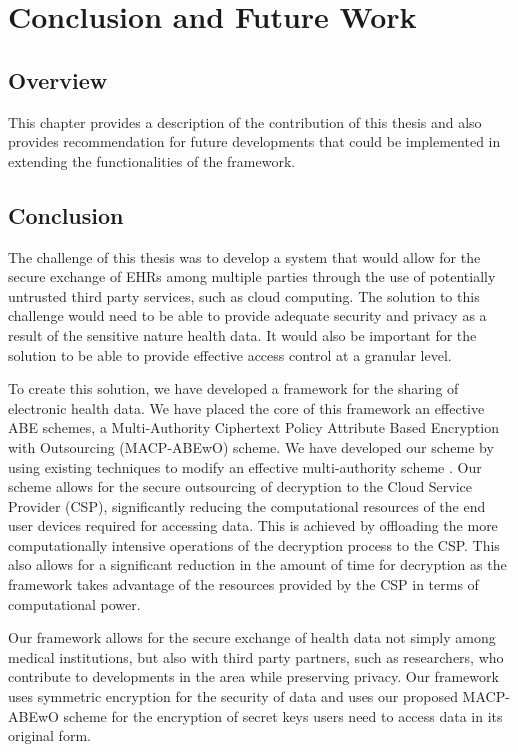 \chapter{Conclusion and Future Work}
\label{chap:conclusions}

\section{Overview}

This chapter provides a description of the contribution of this thesis and also provides recommendation for future developments that could be implemented in extending the functionalities of the framework.

\section{Conclusion}

The challenge of this thesis was to develop a system that would allow for the secure exchange of EHRs among  multiple parties through the use of potentially untrusted third party services, such as cloud computing. The solution to this challenge would need to be able to provide adequate security and privacy as a result of the sensitive nature health data. It would also be important for the solution to be able to provide effective access control at a granular level. 

To create this solution, we have developed a framework for the sharing of electronic health data. We have placed the core of this framework an effective ABE schemes, a Multi-Authority Ciphertext Policy Attribute Based Encryption with Outsourcing (MACP-ABEwO) scheme. We have developed our scheme by using existing techniques to modify an effective multi-authority scheme \cite{Yang2014}. Our scheme allows for the secure outsourcing of decryption to the Cloud Service Provider (CSP), significantly reducing the computational resources of the end user devices required for accessing data. This is achieved by offloading the more computationally intensive operations of the decryption process to the CSP. This also allows for a significant reduction in the amount of time for decryption as the framework takes advantage of the resources provided by the CSP in terms of computational power.

Our framework allows for the secure exchange of health data not simply among medical institutions, but also with third party partners, such as researchers, who contribute to developments in the area while preserving privacy. Our framework uses symmetric encryption for the security of data and uses our proposed MACP-ABEwO scheme for the encryption of secret keys users need to access data in its original form.

